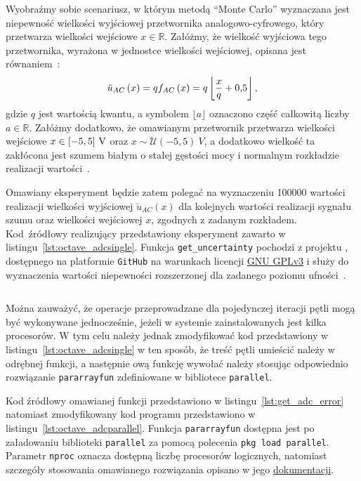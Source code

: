 Wyobraźmy sobie scenariusz, w którym metodą \enquote{Monte Carlo} wyznaczana jest niepewność wielkości wyjściowej przetwornika analogowo-cyfrowego, który przetwarza wielkości wejściowe $x \in \mathbb{R}$. Załóżmy, że wielkość wyjściowa tego przetwornika, wyrażona w jednostce wielkości wejściowej, opisana jest równaniem~\cite{jakubiec_error}:
\begin{equation}
\breve{u}_{AC} \left(x\right) = q f_{AC} \left(x\right) = q \left\lfloor \frac{x}{q} + \num{0.5} \right\rfloor \label{eq:adc_output},
\end{equation}
gdzie $q$ jest wartością kwantu, a symbolem $\lfloor a \rfloor$ oznaczono część całkowitą liczby $a \in \mathbb{R}$. Załóżmy dodatkowo, że omawianym przetwornik przetwarza wielkości wejściowe $x \in \interval{-5}{5}~\unit{V}$ oraz $x \sim \mathcal{U}(-5, 5)~\unit{V}$, a dodatkowo wielkość ta zakłócona jest szumem białym o stałej gęstości mocy i normalnym rozkładzie realizacji wartości~\cite{kuo_white, grimmett_probability}.

Omawiany eksperyment będzie zatem polegać na wyznaczeniu \num{100000} wartości realizacji wielkości wyjściowej $\breve{u}_{AC}(x)$ dla kolejnych wartości realizacji sygnału szumu oraz wielkości wejściowej $x$, zgodnych z zadanym rozkładem. Kod źródłowy realizujący przedstawiony eksperyment zawarto w listingu~\ref{lst:octave_adcsingle}. Funkcja \verb|get_uncertainty| pochodzi z projektu \cite{auth_fwtutils}, dostępnego na platformie \texttt{GitHub} na warunkach licencji \href{https://www.gnu.org/licenses/gpl-3.0.html}{GNU GPLv3} i służy do wyznaczenia wartości niepewności rozszerzonej dla zadanego poziomu ufności~\cite{jcgm_guide}.

\begin{listing}[htb]
\inputminted{octave}{skrypty/octave_adcsingle.m}
\end{listing}

Można zauważyć, że operacje przeprowadzane dla pojedynczej iteracji pętli mogą być wykonywane jednocześnie, jeżeli w systemie zainstalowanych jest kilka procesorów. W tym celu należy jednak zmodyfikować kod przedstawiony w listingu~\ref{lst:octave_adcsingle} w ten sposób, że treść pętli umieścić należy w odrębnej funkcji, a następnie ową funkcję wywołać należy stosując odpowiednio rozwiązanie \verb|pararrayfun| zdefiniowane w bibliotece \texttt{parallel}.

Kod źródłowy omawianej funkcji przedstawiono w listingu~\ref{lst:get_adc_error} natomiast zmodyfikowany kod programu przedstawiono w listingu~\ref{lst:octave_adcparallel}. Funkcja \verb|pararrayfun| dostępna jest po załadowaniu biblioteki \texttt{parallel} za pomocą polecenia \texttt{pkg load parallel}. Parametr \verb|nproc| oznacza dostępną liczbę procesorów logicznych, natomiast szczegóły stosowania omawianego rozwiązania opisano w jego \href{https://gnu-octave.github.io/packages/parallel/}{dokumentacji}.

